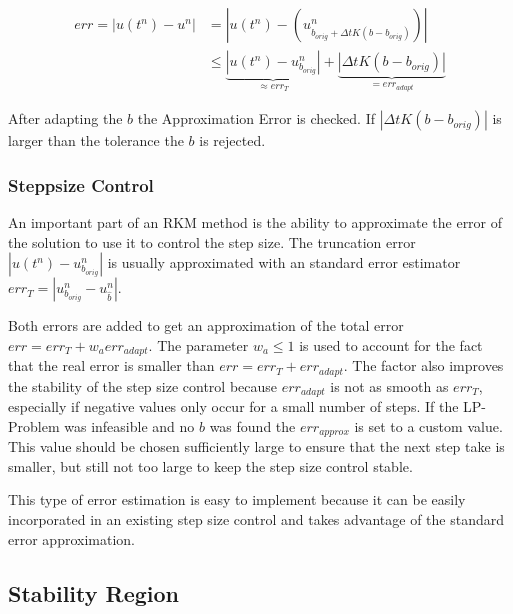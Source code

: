 \documentclass{article}
\begin{document}
\begin{align}
err = |u(t^n)-u^n| &= |u(t^n) - (u^n_{b_{orig}+\Delta t K(b-b_{orig})})| \\
 &\leq \underbrace{|u(t^n)-u^n_{b_{orig}}|}_{\approx err_T}+\underbrace{|\Delta t K(b-b_{orig})|}_{= err_{adapt}}
\end{align}

After adapting the $b$ the Approximation Error is checked. If $|\Delta t K(b-b_{orig})|$ is larger than the tolerance the $b$ is rejected. 

\subsubsection{Steppsize Control}
An important part of an RKM method is the ability to approximate the error of the solution to use it to control the step size. 
The truncation error $|u(t^n)-u^n_{b_{orig}}|$ is usually approximated with an standard error estimator $err_T = | u^{n}_{b_{orig}} - u^{n}_{\hat{b}} |$.

Both errors are added to get an approximation of the total error $err = err_T +w_a err_{adapt}$. The parameter $w_a \leq 1$ is used to account for the fact that the real error is smaller than $err = err_T +err_{adapt}$. The factor also improves the stability of the step size control because $err_{adapt}$ is not as smooth as $err_T$, especially if negative values only occur for a small number of steps.
If the LP-Problem was infeasible and no $b$ was found the $err_{approx}$ is set to a custom value. This value should be chosen sufficiently large to ensure that the next step take is smaller, but still not too large to keep the step size control stable.

This type of error estimation is easy to implement because it can be easily incorporated in an existing step size control and takes advantage of the standard error approximation.


\subsection{Stability Region}
\end{document}
